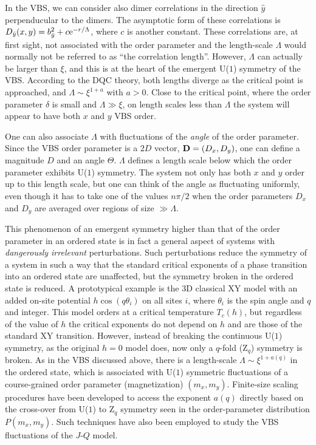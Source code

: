 \documentclass[range]{ar2e}
\begin{document}
In the VBS, we can consider also dimer correlations in the direction $\hat y$ perpenducular to the dimers. The asymptotic form of these correlations is 
$D_{\hat y}(x,y) = b_{\hat y}^2 + c{\rm e}^{-r/\Lambda}$, where $c$ is another constant. These correlations are, at first sight, not associated with the order
parameter and the length-scale $\Lambda$ would normally not be referred to as ``the correlation length''. However, $\Lambda$ can actually be larger than 
$\xi$, and this is at the heart of the emergent U($1$) symmetry of the VBS. According to the DQC theory, both lengths diverge as the critical point is 
approached, and $\Lambda \sim \xi^{1+a}$ with $a>0$. Close to the critical point, where the order parameter $\delta$ is small and $\Lambda \gg \xi$, on 
length scales less than $\Lambda$ the system will appear to have both $x$ and $y$ VBS order.

One can also associate $\Lambda$ with fluctuations of the {\it angle} of the order parameter. Since the VBS order parameter is a $2D$ vector, ${\bf D}= (D_x,D_y)$, 
one can define a magnitude $D$ and an angle $\Theta$. $\Lambda$ defines a length scale below which the order parameter exhibits U($1$) symmetry. The system
not only has both $x$ and $y$ order up to this length scale, but one can think of the angle as fluctuating uniformly, even though it has to take one of the 
values $n\pi/2$ when the order parameters $D_x$ and $D_y$ are averaged over regions of size $\gg \Lambda$.

This phenomenon of an emergent symmetry higher than that of the order parameter in an ordered state is in fact a general aspect of systems with 
{\it dangerously irrelevant} perturbations. Such perturbations reduce the symmetry of a system in such a way that the standard critical exponents 
of a phase transition into an ordered state are unaffected, but the symmetry broken in the ordered state is reduced. A prototypical example is the 3D 
classical XY model with an added on-site potential $h\cos(q\theta_i)$ on all sites $i$, where $\theta_i$ is the spin angle and $q$ and integer. This model 
orders at a critical temperature $T_c(h)$, but regardless of the value of $h$ the critical exponents do not depend on $h$ and are those of the standard 
XY transition. However, instead of breaking the continuous U($1$) symmetry, as the original $h=0$ model does, now only a $q$-fold (Z$_q$) symmetry is 
broken. As in the VBS discussed above, there is a length-scale $\Lambda \sim \xi^{1+a(q)}$ in the ordered state, which is associated with U($1$) symmetric 
fluctuations of a course-grained order parameter (magnetization) $(m_x,m_y)$. Finite-size scaling procedures have been developed to access the exponent 
$a(q)$ directly based on the cross-over from U($1$) to Z$_q$ symmetry seen in the order-parameter distribution $P(m_x,m_y)$. Such techniques have also 
been employed to study the VBS fluctuations of the $J$-$Q$ model.
\end{document}

